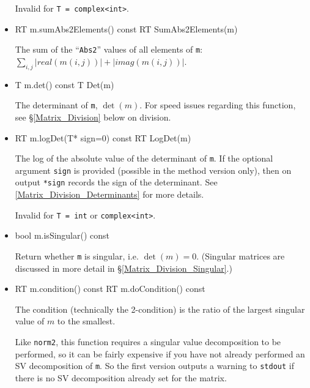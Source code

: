 \documentclass[twoside,letterpaper,11pt]{article}
\renewcommand{\tt}[1]{{\lstinline {#1}}}
\begin{document}
\begin{itemize}
Invalid for \tt{T = complex<int>}.

\item
\begin{tmvcode}
RT m.sumAbs2Elements() const
RT SumAbs2Elements(m)
\end{tmvcode}
The sum of the ``\tt{Abs2}'' values of all elements of \tt{m}: $\sum_{i,j} |real(m(i,j))| + |imag(m(i,j))|$.

\item
\begin{tmvcode}
T m.det() const
T Det(m)
\end{tmvcode}
The determinant of \tt{m}, $\det(m)$.  For speed issues regarding this function, see 
\S\ref{Matrix_Division} below on division.

\item
\begin{tmvcode}
RT m.logDet(T* sign=0) const
RT LogDet(m)
\end{tmvcode}
The log of the absolute value of the determinant of \tt{m}.  If the optional argument \tt{sign} is 
provided (possible in the method version only), then on output \tt{*sign} records the sign of the determinant.  See \ref{Matrix_Division_Determinants} 
for more details.  

Invalid for \tt{T = int} or \tt{complex<int>}.

\item
\begin{tmvcode}
bool m.isSingular() const
\end{tmvcode}
Return whether \tt{m} is singular, i.e. $\det(m) = 0$.
(Singular matrices are discussed in more detail in \S\ref{Matrix_Division_Singular}.)

\item
\begin{tmvcode}
RT m.condition() const
RT m.doCondition() const
\end{tmvcode}
The condition (technically the 2-condition) is 
the ratio of the largest singular value of $m$ to the smallest.

Like \tt{norm2}, this function requires a singular value decomposition to be performed,
so it can be fairly expensive if you have not
already performed an SV decomposition of \tt{m}.
So the first version
outputs a warning to \tt{stdout} if there is no SV decomposition already set for the matrix.


\end{itemize}
\end{document}
